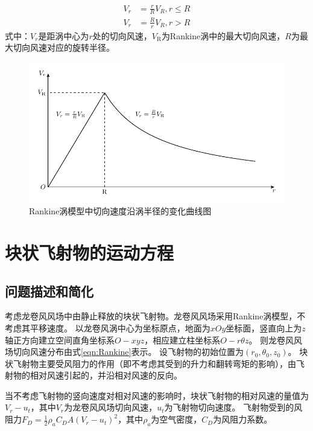 \documentclass{ctexart}
\begin{document}
\begin{equation}
\label{eqn:Rankine}
\begin{split}
    V_r &= \frac{r}{R} V_R,  r \leq R \\
    V_r &= \frac{R}{r} V_R,  r > R
\end{split}
\end{equation}
式中：$V_r$是距涡中心为$r$处的切向风速，$V_{\mathrm{R}}$为Rankine涡中的最大切向风速，$R$为最大切向风速对应的旋转半径。

\begin{figure}[h]
\centering
\includegraphics{./fig/Rankine}
\caption{Rankine涡模型中切向速度沿涡半径的变化曲线图}
\label{fig:Rankine}
\end{figure}

\section{块状飞射物的运动方程}
\subsection{问题描述和简化}
考虑龙卷风风场中由静止释放的块状飞射物。龙卷风风场采用Rankine涡模型，不考虑其平移速度。
以龙卷风涡中心为坐标原点，地面为$xOy$坐标面，竖直向上为$z$轴正方向建立空间直角坐标系$O-xyz$，相应建立柱坐标系$O-r\theta z$。
则龙卷风风场切向风速分布由式\eqref{eqn:Rankine}表示。
设飞射物的初始位置为$(r_0,\theta_0,z_0)$。
块状飞射物主要受风阻力的作用（即不考虑其受到的升力和翻转弯矩的影响），由飞射物的相对风速引起的，并沿相对风速的反向。

当不考虑飞射物的竖向速度对相对风速的影响时，块状飞射物的相对风速的量值为$V_r-u_t$，其中$V_r$为龙卷风风场切向风速，$u_t$为飞射物切向速度。
飞射物受到的风阻力$F_D=\frac{1}{2}\rho_a C_D A \left( V_r - u_t \right)^2 $，其中$\rho_a$为空气密度，$C_D$为风阻力系数。
\end{document}
